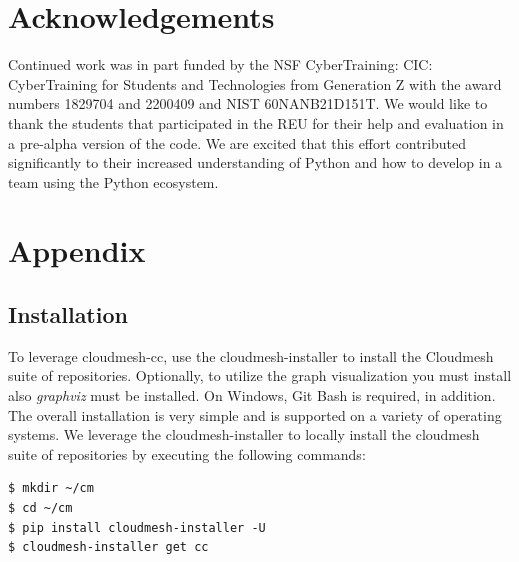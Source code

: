 \documentclass[sigplan,screen]{acmart}
\newcommand{\FILE}[1]{}
\begin{document}
% 

\FILE{acknowledgements.tex}


\section*{Acknowledgements}

Continued work was in part funded by the NSF CyberTraining: CIC:
CyberTraining for Students and Technologies from Generation Z with the
award numbers 1829704 and 2200409 and NIST 60NANB21D151T. We would like to
thank the students that participated in the REU for their help and
evaluation in a pre-alpha version of the code. We are excited that
this effort contributed significantly to their increased understanding
of Python and how to develop in a team using the Python ecosystem.







\appendix

\section{Appendix}

% 

\FILE{installation.tex}

\subsection{Installation}\label{installation}

To leverage cloudmesh-cc, use the cloudmesh-installer to install the
Cloudmesh suite of repositories. Optionally, to utilize the graph
visualization you must install also {\em graphviz} must be
installed. On Windows, Git Bash is required, in addition. The overall
installation is very simple and is supported on a variety of operating
systems. We leverage the cloudmesh-installer to locally install the
cloudmesh suite of repositories by executing the following commands:

\begin{verbatim}
$ mkdir ~/cm
$ cd ~/cm
$ pip install cloudmesh-installer -U
$ cloudmesh-installer get cc
\end{verbatim}
\end{document}
